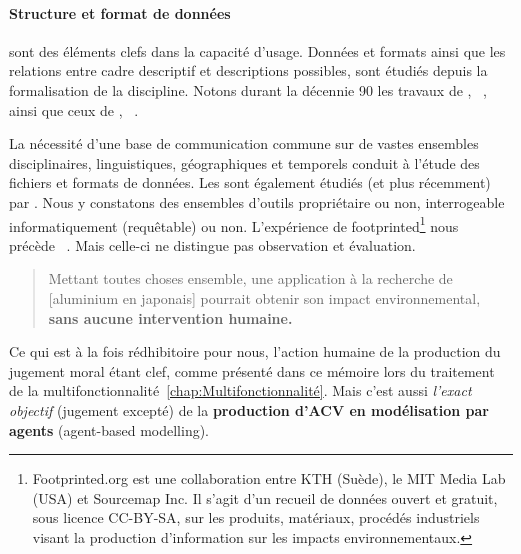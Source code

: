 \paragraph{Structure et format de données} sont des éléments clefs dans la capacité d'usage.
Données et formats ainsi que les relations entre cadre descriptif et descriptions possibles, sont étudiés depuis la formalisation de la discipline.
Notons durant la décennie 90
les travaux de \citeauthor{singhofen_life_1996}, ~\cite{singhofen_life_1996},
ainsi que ceux de  \citeauthor{erixon_assessment_1998}, ~\cite{erixon_assessment_1998}.

La nécessité d'une base de communication commune sur de vastes ensembles disciplinaires, linguistiques, géographiques et temporels conduit à l'étude des fichiers et formats de données.
Les \cite[2.1.4.2 File and Data Types]{sayan_contribution_2011} sont également étudiés (et plus récemment) par \citeauthor{sayan_contribution_2011}.
Nous y constatons des ensembles d'outils propriétaire ou non, interrogeable informatiquement (requêtable) ou non.
L'expérience de footprinted\footnote{
Footprinted.org est une collaboration entre KTH (Suède), le MIT Media Lab (USA) et Sourcemap Inc.
Il s'agit d'un recueil de données ouvert et gratuit, sous licence CC-BY-SA, sur les produits, matériaux, procédés industriels visant la production d'information sur les impacts environnementaux.
} nous précède~\cite{pillmann_innovations_2011}
.
Mais celle-ci ne distingue pas observation et évaluation.
\blockcquote{pillmann_innovations_2011}{
Mettant toutes choses ensemble, une application à la recherche de [aluminium en japonais] pourrait obtenir son impact environnemental, \textbf{sans aucune intervention humaine.}
}
Ce qui est à la fois rédhibitoire pour nous, l'action humaine de la production du jugement moral étant clef, comme présenté dans ce mémoire lors du traitement de la multifonctionnalité~\ref{chap:Multifonctionnalité}.
Mais c'est aussi \emph{l'exact objectif} (jugement excepté) de la \textbf{production d'ACV en modélisation par agents} (agent-based modelling).


